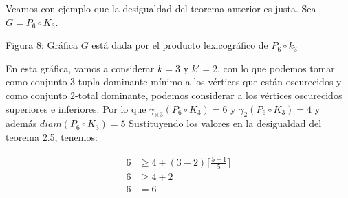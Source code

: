 \documentclass{article}
\begin{document}
Veamos con ejemplo que la desigualdad del teorema anterior es justa. Sea $G = P_{6} \circ K_{3}$.\\

\begin{center}

\vspace{0.5cm}

Figura 8: \small{Gráfica $G$ está dada por el producto lexicográfico de $P_6 \circ k_3$}

\end{center}



En esta gráfica, vamos a considerar $k=3$ y $k'=2$, con lo que podemos tomar como conjunto $3$-tupla dominante mínimo a los vértices que están oscurecidos y como conjunto $2$-total dominante, podemos considerar a los vértices oscurecidos superiores e inferiores. Por lo que $\gamma_{\times 3}(P_{6} \circ K_{3})=6$ y $\gamma_{2}(P_{6} \circ K_{3})=4$ y además $diam(P_{6} \circ K_{3})=5$ Sustituyendo los valores en la desigualdad del teorema 2.5, tenemos:

\begin{align*}
6&\geq4+(3-2)\Big\lceil\frac{5+1}{5}\Big\rceil\\
6&\geq4+2\\
6&=6
\end{align*}
\end{document}
